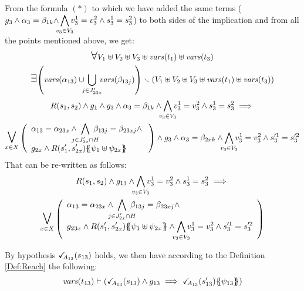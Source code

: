 \documentclass[runningheads]{llncs}
\begin{document}
\begin{enumerate}
\begin{itemize}

From the formula $(*)$ to which we have added the same terms ($g_3 \wedge \alpha_3=\beta_{1k} {\displaystyle \wedge\bigwedge_\subbox{v_3\in V_3}  v^1_3=v^2_3\wedge s^1_3=s^2_3}$) to both sides of the implication and from all the points mentioned above, we get:
\begin{multline*}
\bigforall V_1 \uplus  V_2  \uplus V_3 \uplus  \fvars{t_1} \uplus \fvars{t_3}\\
\bigexists \mpar{\fvars{\alpha_{13}}  \cup\!\!\! \bigcup_{j \in J'_{23x}} \!\!\!\fvars{\beta_{13j} } } \setminus  \mpar{V_1 \uplus  V_2  \uplus V_3 \uplus  \fvars{t_1} \uplus \fvars{t_3}}\\
R\mpar{s_1, s_{2}} \wedge g_1 \wedge g_3 \wedge \alpha_3=\beta_{1k} \wedge \bigwedge_\subbox{v_3\in V_3}  v^1_3=v^2_3\wedge s^1_3=s^2_3\implies\\ \operatorname*{\bigsymb{\bigvee}}_{x \in X} \mpar{\everymath{\displaystyle}
\begin{array}{l}
			\alpha_{13} = \alpha_{23x} \wedge \bigwedge_\subbox{j \in J'_{2x} \cap H} \beta_{13j} = \beta_{23xj} \nwedge\\
			 g_{2x} \wedge R\mpar{s'_1, s'_{2x}}\psubst{\psi_1 \uplus \psi_{2x}}
		\end{array}}  \wedge g_3 \wedge \alpha_3=\beta_{2xk} \wedge \bigwedge_\subbox{v_3\in V_3}  v^1_3=v^2_3\wedge s'^1_3=s'^2_3
\end{multline*}	
That can be re-written as follows:
\begin{multline*}
R\mpar{s_1, s_{2}} \wedge g_{13}  \wedge \bigwedge_\subbox{v_3\in V_3}  v^1_3=v^2_3\wedge s^1_3=s^2_3\implies\\ \operatorname*{\bigsymb{\bigvee}}_{x \in X} \mpar{\everymath{\displaystyle}
\begin{array}{l}
			\alpha_{13} = \alpha_{23x} \wedge \bigwedge_\subbox{j \in J'_{2x} \cap H} \beta_{13j} = \beta_{23xj} \nwedge\\
			 g_{23x} \wedge R\mpar{s'_1, s'_{2x}}\psubst{\psi_1 \uplus \psi_{2x}}\wedge \bigwedge_\subbox{v_3\in V_3}  v^1_3=v^2_3\wedge s'^1_3=s'^2_3
		\end{array}}   
\end{multline*}	

By hypothesis $\checkmark_{\!\! A_{13}}{\left(s_{13}\right)}$ holds,  we then have according to the Definition \ref{Def:Reach} the following:
\[ \fvars{t_{13}} \vdash \left(\reach{A_{13}}\mpar{s_{13}} \wedge g_{13} \implies \reach{A_{13}}\mpar{s_{13}'}\psubst{\psi_{13}}\right) \]	
\end{itemize}




\end{enumerate}
\end{document}
